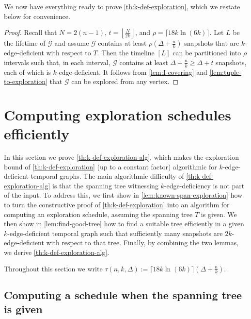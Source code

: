 \documentclass[a4paper,11pt]{article}
\theoremstyle{definition}
\theoremstyle{remark}
\newcommand{\cG}{\ensuremath{\mathcal{G}}}
\begin{document}
    We now have everything ready to prove \cref{th:k-def-exploration}, which we restate below for convenience.
     
    \KDefExploration*
    \begin{proof} 
        Recall that $N=2(n-1)$, $t = \left\lfloor \frac{N}{2k} \right\rfloor$, and $\rho = \lceil 18k \ln(6k) \rceil$.
        Let $L$ be the lifetime of $\cG$ and assume $\cG$ contains at least $\rho(\Delta+ \frac{n}{k})$ snapshots that are $k$-edge-deficient with respect to $T$. Then the timeline $[L]$ can be partitioned into $\rho$ intervals such that, in each interval, $\cG$ contains at least $\Delta + \frac{n}{k} \geq \Delta + t$ snapshots, each of which is $k$-edge-deficient. 
		It follows from \cref{lem:I-covering} and \cref{lem:tuple-to-exploration} that $\cG$ can be explored from any  vertex.
    \end{proof}

    \section{Computing exploration schedules efficiently}
    \label{sec:efficient-computation}

    In this section we prove \cref{th:k-def-exploration-alg}, which makes the exploration bound of \cref{th:k-def-exploration} (up to a constant factor) algorithmic for $k$-edge-deficient temporal graphs. The main algorithmic difficulty of \cref{th:k-def-exploration-alg} is that the spanning tree witnessing $k$-edge-deficiency is not part of the input.
%
    To address this, we first show in \cref{lem:known-span-exploration} how to turn the constructive proof of \cref{th:k-def-exploration} into an algorithm for computing an exploration schedule, assuming the spanning tree $T$ is given.
    We then show in \cref{lem:find-good-tree} how to find a suitable tree efficiently in a given $k$-edge-deficient temporal graph such that sufficiently many snapshots are $2k$-edge-deficient with respect to that tree. Finally, by combining the two lemmas, we derive \cref{th:k-def-exploration-alg}.

    Throughout this section we write
    $\tau(n,k,\Delta) := \lceil 18k \ln(6k) \rceil \left(\Delta+\frac{n}{k}\right)$.
    

    \subsection{Computing a schedule when the spanning tree is given}
    \label{subsec:efficient-given-tree}
\end{document}

